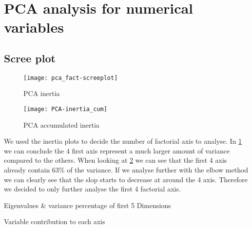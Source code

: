 

\section{PCA analysis for numerical variables}%
\label{sec:pca_analysis_for_numerical_variables}

\subsection{Scree plot}%
\label{sub:scree_plot}


\begin{figure}[H]
    \centering
    \texttt{[image: pca\_fact-screeplot]} %
    \caption{PCA inertia}%
    \label{fig:pca_inertia}
\end{figure}

\begin{figure}[H]
    \centering
    \texttt{[image: PCA-inertia\_cum]}
    \caption{PCA accumulated inertia}%
    \label{fig:pca_inertia_cum}
\end{figure}

\vspace{-1em}
We used the inertia plots to decide the number of factorial axis to analyse. In
\cref{fig:pca_inertia} we can conclude the 4 first axis represent a much
larger amount of variance compared to the others. When looking at
\cref{fig:pca_inertia_cum} we can see that the first 4 axis already contain 63\%
of the variance. If we analyse further with the elbow method we can clearly see
that the slop starts to decrease at around the 4 axis. Therefore we decided to
only further analyse the first 4 factorial axis.


\begin{table}[H]
    \caption{Eigenvalues \& variance percentage of first 5 Dimensions}%
    \label{tab:eig}
    
\end{table}

\begin{table}[H]
    \caption{Variable contribution to each axis}%
    \label{tab:}
    
\end{table}

